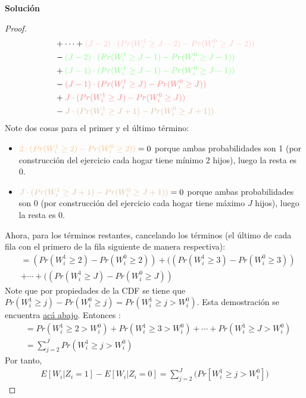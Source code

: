 \documentclass[a4paper, answers, addpoints, 11pt]{exam}
\newenvironment{solucion}{%
  \begin{mdframed}[
    backgroundcolor=blue!5,    %
    linecolor=blue!50,          %
    linewidth=2pt,              %
    leftmargin=10pt,            %
    rightmargin=8pt,           %
    topline=true,              %
    bottomline=true,            %
    roundcorner=10pt,           %
    innerleftmargin=10pt,       %
    innerrightmargin=10pt,      %
    innerbottommargin=10pt,     %
    innertopmargin=10pt         %
  ]%
  \begin{tcolorbox}[colframe=blue!50!black, colback=blue!50, coltitle=white, sharp corners=all, boxrule=1mm, width=\textwidth, halign=left, valign=center, top=0mm, bottom=0mm, left=0mm, right=0mm] \textbf{Solución} \end{tcolorbox} }{\end{mdframed}}
\begin{document}
\begin{enumerate}
\begin{enumerate}
\begin{solucion}
\begin{proof}
\begin{align*}
&+ \cdots + \textcolor{pink!90}{(J-2) \cdot (Pr(W_i^1 \geq J-2) - Pr(W_i^0 \geq J-2))} \\
&- \textcolor{green!50}{(J-2) \cdot (Pr(W_i^1 \geq J-1) - Pr(W_i^0 \geq J-1))} \\
&+ \textcolor{green!50}{(J-1) \cdot (Pr(W_i^1 \geq J-1) - Pr(W_i^0 \geq J-1))} \\
&- \textcolor{red!50}{(J-1) \cdot (Pr(W_i^1 \geq J) - Pr(W_i^0 \geq J))}\\
&+ \textcolor{red!50}{J \cdot (Pr(W_i^1 \geq J) - Pr(W_i^0 \geq J))} \\
&- \textcolor{brown!50}{J \cdot (Pr(W_i^1 \geq J+1) - Pr(W_i^0 \geq J+1))}
\end{align*}
Note dos cosas para el primer y el último término:
\begin{itemize}
    \item $\textcolor{orange!50}{2 \cdot (Pr(W_i^1 \geq 2) - Pr(W_i^0 \geq 2))} =0$ porque ambas probabilidades son 1 (por construcción del ejercicio cada hogar tiene mínimo 2 hijos), luego la resta es 0.
     \item $\textcolor{brown!50}{J \cdot (Pr(W_i^1 \geq J+1) - Pr(W_i^0 \geq J+1))}=0$  porque ambas probabilidades son 0 (por construcción del ejercicio cada hogar tiene máximo $J$ hijos), luego la resta es 0.
\end{itemize}
Ahora, para los términos restantes, cancelando los términos (el último de cada fila con el primero de la fila siguiente de manera respectiva):
\begin{align*}
&= (Pr(W_i^1 \geq 2) - Pr(W_i^0 \geq 2) )+ ((Pr(W_i^1 \geq 3) - Pr(W_i^0 \geq 3)) \\
&+ \cdots + ((Pr(W_i^1 \geq J) - Pr(W_i^0 \geq J))
\end{align*}
Note que por propiedades de la CDF se tiene que  $Pr(W_i^1 \geq j) - Pr(W_i^0 \geq j) = Pr(W_i^1 \geq j > W_i^0)$. Esta demostración se encuentra \hyperlink{claimprobaj}{acá abajo}. Entonces : 
\begin{align*}
&= Pr(W_i^1 \geq 2 > W_i^0) + Pr(W_i^1 \geq 3 > W_i^0) + \cdots + Pr(W_i^1 \geq J > W_i^0)\\
&= \sum_{j=2}^{J} Pr(W_i^1 \geq j > W_i^0)
\end{align*}
Por tanto, \begin{align*}
                E[W_i | Z_i = 1 ] - E[W_i | Z_i = 0 ] = \sum_{j=2}^J \Big( Pr[W_i^1 \geq j > W_i^0] \Big) 
            \end{align*}
            \end{proof}
            \begin{mdframed}[backgroundcolor=moraditoClaro]

\end{mdframed}
\end{solucion}
\end{enumerate}
\end{enumerate}
\end{document}
